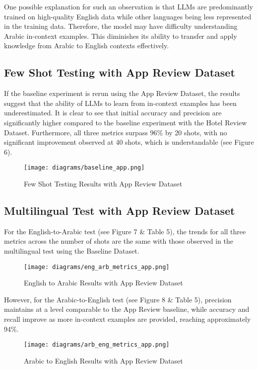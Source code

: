 \documentclass[sigconf, nonacm]{acmart}
\theoremstyle{definition}
\begin{document}
One possible explanation for such an observation is that LLMs are predominantly trained on high-quality English data while other languages being less represented in the training data. Therefore, the model may have difficulty understanding Arabic in-context examples. This diminishes its ability to transfer and apply knowledge from Arabic to English contexts effectively.

\subsection{Few Shot Testing with App Review Dataset}

If the baseline experiment is rerun using the App Review Dataset, the results suggest that the ability of LLMs to learn from in-context examples has been underestimated. It is clear to see that initial accuracy and precision are significantly higher compared to the baseline experiment with the Hotel Review Dataset. Furthermore, all three metrics surpass 96\% by 20 shots, with no significant improvement observed at 40 shots, which is understandable (see Figure 6).

\begin{figure}[h]
  \centering
  \texttt{[image: diagrams/baseline\_app.png]}
  \caption{Few Shot Testing Results with App Review Dataset}
\end{figure}

\subsection{Multilingual Test with App Review Dataset}

For the English-to-Arabic test (see Figure 7 \& Table 5), the trends for all three metrics across the number of shots are the same with those observed in the multilingual test using the Baseline Dataset.

\begin{figure}[h]
  \centering
  \texttt{[image: diagrams/eng\_arb\_metrics\_app.png]}
  \caption{English to Arabic Results with App Review Dataset}
\end{figure}

However, for the Arabic-to-English test (see Figure 8 \& Table 5), precision maintains at a level comparable to the App Review baseline, while accuracy and recall improve as more in-context examples are provided, reaching approximately 94\%.

\begin{figure}[h]
  \centering
  \texttt{[image: diagrams/arb\_eng\_metrics\_app.png]}
  \caption{Arabic to English Results with App Review Dataset}
\end{figure}
\end{document}
